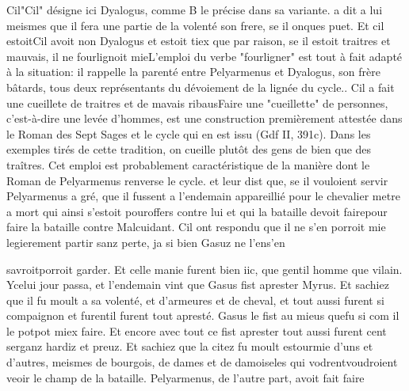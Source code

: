 \documentclass{article}
\begin{document}
\begin{pages}
                  Cil"Cil" désigne ici Dyalogus,
                        comme B le précise dans sa variante. a dit a lui meismes que il fera une partie de la volenté son frere, se
                        il onques puet. Et cil estoitCil avoit non Dyalogus et estoit tiex que par raison, se il estoit traitres et mauvais, il ne fourlignoit
                  mieL'emploi du verbe "fourligner" est tout à fait adapté
                  à la situation: il rappelle la parenté entre Pelyarmenus et Dyalogus, son frère
                  bâtards, tous deux représentants du dévoiement de la lignée du cycle.. Cil
               a fait une cueillete de traitres et de mavais ribausFaire
                  une "cueillette" de personnes, c'est-à-dire une levée d'hommes, est une
                  construction premièrement attestée dans le Roman des Sept
                     Sages et le cycle qui en est issu (Gdf II, 391c). Dans les exemples tirés
                  de cette tradition, on cueille plutôt des gens de bien que des traîtres. Cet
                  emploi est probablement caractéristique de la manière dont le Roman de Pelyarmenus renverse le cycle. et leur dist que, se il vouloient servir Pelyarmenus a gré, que il fussent a l’endemain appareillié pour le chevalier metre a mort qui ainsi s’estoit
                  pouroffers 
                     contre lui et qui la bataille devoit fairepour faire la bataille contre Malcuidant. Cil ont
               respondu que il ne s’en porroit mie 
                     legierement partir sanz perte, ja
                  si bien Gasuz ne 
                     l’ens'en
                  
                     savroitporroit garder. Et celle manie furent bien iic, que gentil 
                  homme que vilain. Ycelui jour passa, et l’endemain vint que Gasus fist aprester Myrus. Et
               sachiez que il fu moult a sa volenté, 
                  et d’armeures et de cheval, et tout aussi furent si compaignon 
                  et 
                        furentil furent tout apresté. Gasus le 
                  fist au mieus quefu si com il le 
                  potpot miex faire. Et 
                  encore avec tout ce fist aprester tout aussi furent cent serganz hardiz et preuz. Et sachiez que la citez fu moult estourmie d’uns
               et d’autres, meismes de bourgois, de dames et de damoiseles qui 
                  vodrentvoudroient veoir le champ de la bataille. Pelyarmenus, de l’autre part, avoit fait 
                  faire
               

\end{pages}
\end{document}
